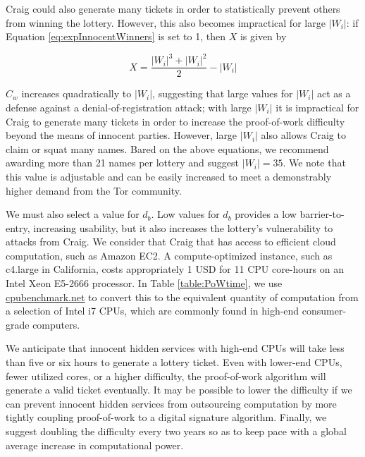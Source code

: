 \documentclass[USenglish,oneside,twocolumn]{article}
\newcommand*\nWinners{\left\vert{W_{i}}\right\vert}
\begin{document}
Craig could also generate many tickets in order to statistically prevent others from winning the lottery. However, this also becomes impractical for large $ \nWinners $: if Equation \ref{eq:expInnocentWinners} is set to 1, then $ X $ is given by 

\begin{equation}
	X = \frac{\nWinners^{3} + \nWinners^{2}}{2} - \nWinners
\end{equation}

$ C_{w} $ increases quadratically to $ \nWinners $, suggesting that large values for $ \nWinners $ act as a defense against a denial-of-registration attack; with large $ \nWinners $ it is impractical for Craig to generate many tickets in order to increase the proof-of-work difficulty beyond the means of innocent parties. However, large $ \nWinners $ also allows Craig to claim or squat many names. Bared on the above equations, we recommend awarding more than 21 names per lottery and suggest $ \nWinners = 35 $. We note that this value is adjustable and can be easily increased to meet a demonstrably higher demand from the Tor community.

We must also select a value for $ d_{b} $. Low values for $ d_{b} $ provides a low barrier-to-entry, increasing usability, but it also increases the lottery's vulnerability to attacks from Craig. We consider that Craig that has access to efficient cloud computation, such as Amazon EC2. A compute-optimized instance, such as c4.large in California, costs appropriately 1 USD for 11 CPU core-hours on an Intel Xeon E5-2666 processor. In Table \ref{table:PoWtime}, we use \href{https://www.cpubenchmark.net/}{cpubenchmark.net} to convert this to the equivalent quantity of computation from a selection of Intel i7 CPUs, which are commonly found in high-end consumer-grade computers.


We anticipate that innocent hidden services with high-end CPUs will take less than five or six hours to generate a lottery ticket. Even with lower-end CPUs, fewer utilized cores, or a higher difficulty, the proof-of-work algorithm will generate a valid ticket eventually. It may be possible to lower the difficulty if we can prevent innocent hidden services from outsourcing computation by more tightly coupling proof-of-work to a digital signature algorithm. Finally, we suggest doubling the difficulty every two years so as to keep pace with a global average increase in computational power.
\end{document}
